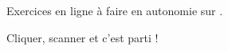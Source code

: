 \begin{mathalea}[][\aleatexLogo]
    Exercices en ligne à faire en autonomie sur \href{https://aleatex.mathslozano.fr}{\aleatexLogo}. 

    Cliquer, scanner et c'est parti !
    
\end{mathalea}
